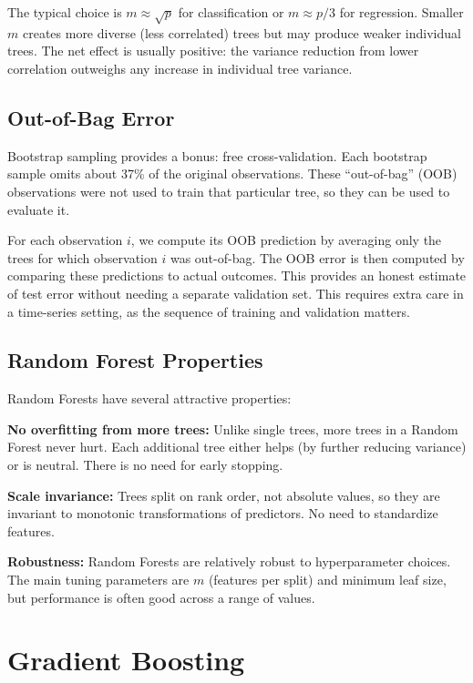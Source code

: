 \documentclass[11pt,a4paper]{article}
\begin{document}
The typical choice is $m \approx \sqrt{p}$ for classification or $m \approx p/3$ for regression. Smaller $m$ creates more diverse (less correlated) trees but may produce weaker individual trees. The net effect is usually positive: the variance reduction from lower correlation outweighs any increase in individual tree variance.

\subsection{Out-of-Bag Error}

Bootstrap sampling provides a bonus: free cross-validation. Each bootstrap sample omits about 37\% of the original observations. These ``out-of-bag'' (OOB) observations were not used to train that particular tree, so they can be used to evaluate it.

For each observation $i$, we compute its OOB prediction by averaging only the trees for which observation $i$ was out-of-bag. The OOB error is then computed by comparing these predictions to actual outcomes. This provides an honest estimate of test error without needing a separate validation set. This requires extra care in a time-series setting, as the sequence of training and validation matters. 

\subsection{Random Forest Properties}

Random Forests have several attractive properties:

\textbf{No overfitting from more trees:} Unlike single trees, more trees in a Random Forest never hurt. Each additional tree either helps (by further reducing variance) or is neutral. There is no need for early stopping.

\textbf{Scale invariance:} Trees split on rank order, not absolute values, so they are invariant to monotonic transformations of predictors. No need to standardize features.

\textbf{Robustness:} Random Forests are relatively robust to hyperparameter choices. The main tuning parameters are $m$ (features per split) and minimum leaf size, but performance is often good across a range of values.

\section{Gradient Boosting}
\end{document}
